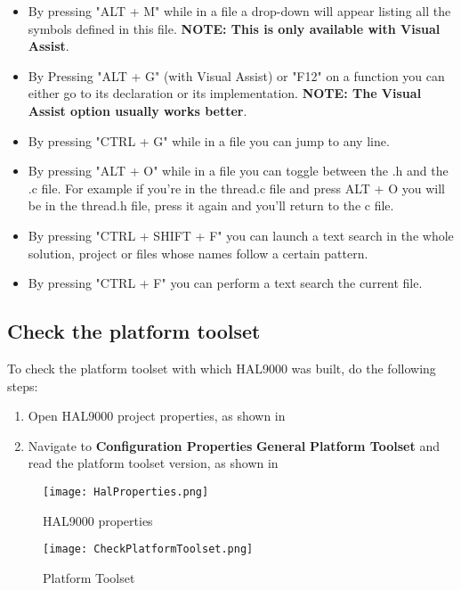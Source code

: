 \begin{appendices}
\begin{itemize}
	\item By pressing "ALT + M" while in a file a drop-down will appear listing all the symbols
defined in this file. \textbf{NOTE: This is only available with Visual Assist}.

	\item By Pressing "ALT + G" (with Visual Assist) or "F12" on a function you can either go to
its declaration or its implementation. \textbf{NOTE: The Visual Assist option usually works better}.

	\item By pressing "CTRL + G" while in a file you can jump to any line.

	\item By pressing "ALT + O" while in a file you can toggle between the .h and the .c file. For
example if you're in the thread.c file and press ALT + O you will be in the thread.h file, press it
again and you'll return to the c file.

	\item By pressing "CTRL + SHIFT + F" you can launch a text search in the whole solution, project
or files whose names follow a certain pattern.

	\item By pressing "CTRL + F" you can perform a text search the current file.

\end{itemize}

\subsection{Check the platform toolset}
\label{sect:CheckPlatformToolset}

To check the platform toolset with which HAL9000 was built, do the following steps:
\begin{enumerate}
	\item Open HAL9000 project properties, as shown in 
	\item Navigate to \textbf{Configuration Properties} \textrightarrow \textbf{General} \textrightarrow \textbf{Platform Toolset}
		  and read the platform toolset version, as shown in 
\end{enumerate}
\begin{figure}[]
	\centering
	\texttt{[image: HalProperties.png]}
	\caption{HAL9000 properties}
	\label{fig:HalProperties}
\end{figure}
\begin{figure}[]
	\centering
	\texttt{[image: CheckPlatformToolset.png]}
	\caption{Platform Toolset}
	\label{fig:CheckPlatformToolset}
\end{figure}


\end{appendices}
